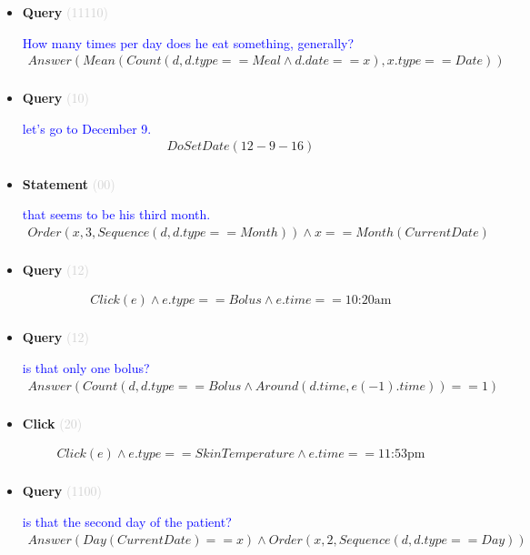 \documentclass[11pt]{article}
\newcommand{\key}[1]{\textcolor{lightgray}{#1}}
\newcounter{CQuery}
\newcounter{CStatement}
\newcounter{CClick}
\begin{document}
\begin{itemize}
\item
\textbf{Query\theCQuery} \key{(11110)} \addtocounter{CQuery}{1}
\textcolor{blue}{ How many times per day does he eat something, generally? }
\begin{multline*}
Answer(Mean(Count(d, d.type==Meal \wedge d.date==x), x.type==Date)) \\ 
\end{multline*}


\item
\textbf{Query\theCQuery} \key{(10)} \addtocounter{CQuery}{1}
\textcolor{blue}{ let's go to December 9. }
\begin{multline*}
DoSetDate(12-9-16) \\ 
\end{multline*}


\item
\textbf{Statement\theCStatement} \key{(00)} \addtocounter{CStatement}{1}
\textcolor{blue}{ that seems to be his third month. }
\begin{multline*}
Order(x, 3, Sequence(d, d.type==Month)) \wedge x==Month(CurrentDate) \\ 
\end{multline*}


\item
\textbf{Query\theCQuery} \key{(12)} \addtocounter{CQuery}{1}
\textcolor{blue}{  }
\begin{multline*}
Click(e) \wedge e.type == Bolus \wedge e.time==\mbox{10:20am} \\ 
\end{multline*}


\item
\textbf{Query\theCQuery} \key{(12)} \addtocounter{CQuery}{1}
\textcolor{blue}{ is that only one bolus? }
\begin{multline*}
Answer(Count(d, d.type==Bolus \wedge Around(d.time, e(-1).time))==1) \\ 
\end{multline*}


\item
\textbf{Click\theCClick} \key{(20)} \addtocounter{CClick}{1}
\textcolor{blue}{  }
\begin{multline*}
Click(e) \wedge e.type==SkinTemperature \wedge e.time==\mbox{11:53pm} \\ 
\end{multline*}


\item
\textbf{Query\theCQuery} \key{(1100)} \addtocounter{CQuery}{1}
\textcolor{blue}{ is that the second day of the patient? }
\begin{multline*}
Answer(Day(CurrentDate)==x) \wedge Order(x, 2, Sequence(d, d.type==Day)) \\ 
\end{multline*}



\end{itemize}
\end{document}

